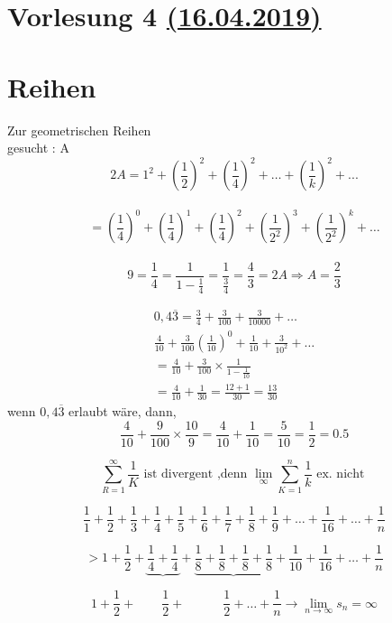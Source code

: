 


\section{Vorlesung 4 \href{https://tu-dresden.de/mn/math/algebra/das-institut/beschaeftigte/antje-noack/ressourcen/dateien/v120-1/MathMethInf04.pdf?lang=en}{(16.04.2019)} }
\section{Reihen}
\begin{example}{Zur geometrischen Reihen}\\
gesucht : A
\[2A = 1^2 + (\frac{1}{2})^2+(\frac{1}{4})^2 + \dots + (\frac{1}{k})^2 + ... \]\\
\[= (\frac{1}{4})^0 + (\frac{1}{4})^1+ (\frac{1}{4})^2+(\frac{1}{2^2})^3+(\frac{1}{2^2})^k+ \dots \]\\
\[9 = \frac{1}{4} = \frac{1}{1- \frac{1}{4}} = \frac{1}{\frac{3}{4}} = \frac{4}{3}= 2A \Rightarrow A = \frac{2}{3}\] 
\end{example}

\begin{example}
\begin{equation}
\begin{aligned}
0,4 \overline{3} = \frac{3}{4} + \frac{3}{100} + \frac{3}{10000}+ \dots \\
\frac{4}{10} + \frac{3}{100}(\frac{1}{10})^0 + \frac{1}{10} + \frac{3}{10^2} + \dots \\
=\frac{4}{10} + \frac{3}{100} \times \frac{1}{1-\frac{1}{10}}\\
= \frac{4}{10}+ \frac{1}{30} = \frac{12+1}{30}= \frac{13}{30}
\end{aligned}
\end{equation}
wenn $0,4 \overline{3}$ erlaubt wäre, dann,\\
\[\frac{4}{10} + \frac{9}{100} \times \frac{10}{9} = \frac{4}{10} + \frac{1}{10} = \frac{5}{10} = \frac{1}{2} = 0.5  \]
\end{example}

\newpage
\begin{example}
	\[\sum_{R=1}^{\infty} \frac{1}{K} \text{ ist divergent ,denn  } \lim\limits_{\infty} \sum_{K=1}^{n} \frac{1}{k} \text{ ex. nicht } \]
	
	\[\frac{1}{1}+\frac{1}{2}+\frac{1}{3}+\frac{1}{4}+\frac{1}{5}+\frac{1}{6}+\frac{1}{7}+\frac{1}{8}+\frac{1}{9}+\dots+\frac{1}{16}+\dots+\frac{1}{n}\]
	
	\[ > 1+\frac{1}{2}+  \underbrace{\frac{1}{4}+\frac{1}{4}}+\underbrace{\frac{1}{8}+\frac{1}{8}+\frac{1}{8}+\frac{1}{8}}+\frac{1}{10}+\frac{1}{16}+\dots+\frac{1}{n}\] 
	
	\[1+\frac{1}{2} + \qquad \frac{1}{2}+   \quad  \qquad \frac{1}{2}  + \dots + \frac{1}{n}  \rightarrow \lim\limits_{n\rightarrow \infty }s_n = \infty \]
	
\end{example}
